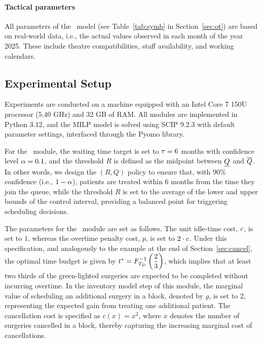 \paragraph{\textbf{Tactical parameters}}
All parameters of the \modelname~model (see Table~\ref{tab:symb} in Section~\ref{sec:ot}) are based on real-world data, i.e., the actual values observed in each month of the year 2025.
These include theatre compatibilities, staff availability, and working calendars.

\subsection{Experimental Setup\label{sec:experimental_setup}}
Experiments are conducted on a machine equipped with an Intel Core 7 150U processor (5.40 GHz) and 32 GB of RAM. 
All modules are implemented in Python 3.12, and the MILP model is solved using SCIP 9.2.3 with default parameter settings, interfaced through the Pyomo library.

For the \rqmodule~module, the waiting time target is set to $\tau = 6$ months with confidence level $\alpha = 0.1$, and the threshold $R$ is defined as the midpoint between $\underline{Q}$ and $\overline{Q}$.
In other words, we design the $(R,Q)$ policy to ensure that, with 90\% confidence (i.e., $1 - \alpha$), patients are treated within 6 months from the time they join the queue, while the threshold $R$ is set to the average of the lower and upper bounds of the control interval, providing a balanced point for triggering scheduling decisions.

The parameters for the \overtimemodule~module are set as follows. 
The unit idle-time cost, $c$, is set to $1$, whereas the overtime penalty cost, $p$, is set to $2 \cdot c$.
Under this specification, and analogously to the example at the end of Section~\ref{sec:cancel}, the optimal time budget is given by $t^{*} = F^{-1}_{T_D} \left( \dfrac{2}{3} \right)$, which implies that at least two thirds of the green-lighted surgeries are expected to be completed without incurring overtime.
In the inventory model step of this module, the marginal value of scheduling an additional surgery in a block, denoted by $g$, is set to $2$, representing the expected gain from treating one additional patient. 
The cancellation cost is specified as $c(x)=x^2$, where $x$ denotes the number of surgeries cancelled in a block, thereby capturing the increasing marginal cost of cancellations.

